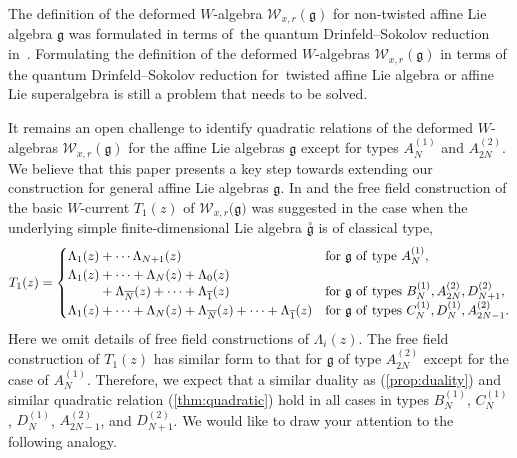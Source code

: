 \documentclass[10pt,a4paper]{amsart}
\numberwithin{equation}{section}
\begin{document}
The definition of the deformed $W$-algebra ${\mathcal W}_{x,r}(\mathfrak{g})$
for non-twisted affine Lie algebra ${\mathfrak g}$
was formulated in terms of~the quantum Drinfeld--Sokolov reduction in~\cite{Sevostyanov}.
Formulating the definition of
the deformed $W$-algebras ${\mathcal W}_{x,r}({\mathfrak g})$
in terms of the quantum Drinfeld--Sokolov reduction
for~twisted affine Lie algebra or affine Lie superalgebra
\cite{Ding-Feigin,Feigin-Jimbo-Mukhin-Vilkoviskiy,
Harada-Matsuo-Noshita-Watanabe, Kojima2, Kojima1} is still a problem that needs to be solved.

It remains an open challenge
to identify quadratic relations of the deformed $W$-algebras
${\mathcal W}_{x,r}({\mathfrak g})$ for the affine Lie algebras ${\mathfrak g}$
except for types $A_N^{(1)}$ and $A_{2N}^{(2)}$. We believe
that this paper presents a key step towards extending our construction for general affine Lie algebras
${\mathfrak g}$. In \cite{Frenkel-Reshetikhin1} and
\cite{Feigin-Jimbo-Mukhin-Vilkoviskiy} the free field construction of the basic $W$-current $T_1(z)$
of ${\mathcal W}_{x,r}\big({\mathfrak g}\big)$
was suggested in the case when
the underlying simple finite-dimensional Lie algebra
$\stackrel{\circ}{\mathfrak g}$ is of classical type,
\begin{gather*}
T_1(z)=\begin{cases}
\Lambda_1(z)+\cdots \Lambda_{N+1}(z)&{{\rm for}~{\mathfrak g}~{\rm of~type}}~A_N^{(1)},
\\
\Lambda_1(z)+\cdots+\Lambda_N(z)+\Lambda_0(z)
\\[-.5ex]
\hphantom{\Lambda_1(z)}+\Lambda_{\overline{N}}(z)+\cdots+\Lambda_{\overline{1}}(z)&
{{\rm for}~{\mathfrak g}~{\rm of~types}}~B_N^{(1)}, A_{2N}^{(2)}, D_{N+1}^{(2)},
\\
\Lambda_1(z)+\cdots+\Lambda_N(z)+
\Lambda_{\overline{N}}(z)+\cdots+\Lambda_{\overline{1}}(z)
&{{\rm for}~{\mathfrak g}~{\rm of~types}}~C_N^{(1)}, D_N^{(1)}, A_{2N-1}^{(2)}.
\end{cases}
\end{gather*}
Here we omit details of free field constructions of $\Lambda_i(z)$.
The free field construction of $T_1(z)$ has similar form to that
for ${\mathfrak g}$ of type $A_{2N}^{(2)}$
except for the case of $A_N^{(1)}$. Therefore, we expect that
a similar duality as (\ref{prop:duality}) and similar quadratic relation (\ref{thm:quadratic})
hold in all cases in types $B_N^{(1)}$, $C_N^{(1)}$, $D_N^{(1)}$, $A_{2N-1}^{(2)}$, and
$D_{N+1}^{(2)}$. We would like to draw your attention to the following analogy.
\end{document}
